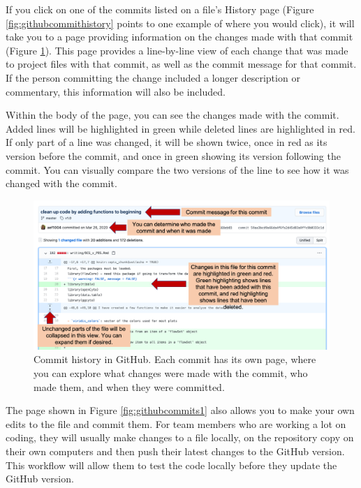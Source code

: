 \documentclass[]{tufte-book}
\begin{document}
If you click on one of the commits listed on a file's History page (Figure
\ref{fig:githubcommithistory} points to one example of where you would click),
it will take you to a page providing information on the changes made with that
commit (Figure \ref{fig:githubcommithistory2}). This page provides a
line-by-line view of each change that was made to project files with that
commit, as well as the commit message for that commit. If the person
committing the change included a longer description or commentary,
this information will also be included.

Within the body of the page, you can see the changes made with the commit. Added
lines will be highlighted in green while deleted lines are highlighted in red.
If only part of a line was changed, it will be shown twice, once in red as its
version before the commit, and once in green showing its version following the
commit. You can visually compare the two versions of the line to see how it was
changed with the commit.

\begin{figure}
\includegraphics[width=\textwidth]{figures/github_commit_history2} \caption[Commit history in GitHub]{Commit history in GitHub. Each commit has its own page, where you can explore what changes were made with the commit, who made them, and when they were committed.}\label{fig:githubcommithistory2}
\end{figure}

The page shown in Figure \ref{fig:githubcommits1} also allows you to make your
own edits to the file and commit them. For team members who are working a lot on
coding, they will usually make changes to a file locally, on the repository copy
on their own computers and then push their latest changes to the GitHub version.
This workflow will allow them to test the code locally before they update the
GitHub version.
\end{document}
